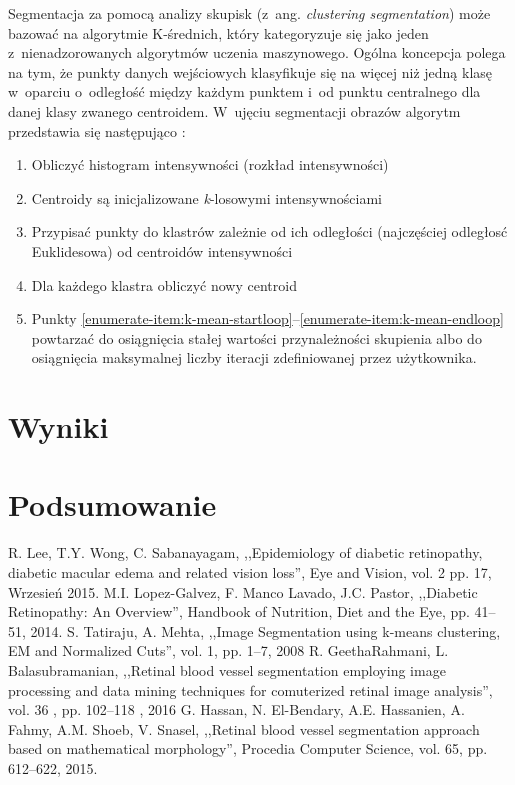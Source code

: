 \documentclass[conference]{IEEEtran}
\begin{document}
Segmentacja za pomocą analizy skupisk (z~ang. \textit{clustering segmentation}) może bazować na algorytmie K-średnich, który kategoryzuje się jako jeden z~nienadzorowanych algorytmów uczenia maszynowego. Ogólna koncepcja polega na tym, że punkty danych wejściowych klasyfikuje się na więcej niż jedną klasę w~oparciu o~odległość między każdym punktem i~od punktu centralnego dla danej klasy zwanego centroidem.
W~ujęciu segmentacji obrazów algorytm przedstawia się następująco \cite{b5}:
\begin{enumerate}
\item Obliczyć histogram intensywności (rozkład intensywności)
\item Centroidy są inicjalizowane \textit{k}-losowymi intensywnościami
\item  Przypisać punkty do klastrów zależnie od ich odległości (najczęściej odległosć Euklidesowa) od centroidów intensywności
\label{enumerate-item:k-mean-startloop}
\item \label{enumerate-item:k-mean-endloop}Dla każdego klastra obliczyć nowy centroid
\item Punkty \ref{enumerate-item:k-mean-startloop}--\ref{enumerate-item:k-mean-endloop} powtarzać do osiągnięcia stałej wartości przynależności skupienia albo do osiągnięcia maksymalnej liczby iteracji zdefiniowanej przez użytkownika.
\end{enumerate}


\section{Wyniki}

\section{Podsumowanie}

\begin{thebibliography}{00}
 R. Lee, T.Y. Wong, C. Sabanayagam, ,,Epidemiology of diabetic retinopathy, diabetic macular edema and related vision loss'', Eye and Vision, vol. 2 pp. 17, Wrzesień 2015.
 M.I. Lopez-Galvez, F. Manco Lavado, J.C. Pastor, ,,Diabetic Retinopathy: An Overview'', Handbook of Nutrition, Diet and the Eye, pp. 41--51, 2014.
 S. Tatiraju, A. Mehta, ,,Image Segmentation using k-means clustering, EM and Normalized Cuts'', vol. 1, pp. 1--7, 2008
 R. GeethaRahmani, L. Balasubramanian, ,,Retinal blood vessel segmentation employing image processing and data mining techniques for comuterized retinal image analysis'', vol. 36 , pp. 102--118 , 2016
 G. Hassan, N. El-Bendary, A.E. Hassanien, A. Fahmy, A.M. Shoeb, V. Snasel, ,,Retinal blood vessel segmentation approach based on mathematical morphology'', Procedia Computer Science, vol. 65, pp. 612--622, 2015.

\end{thebibliography}
\end{document}
